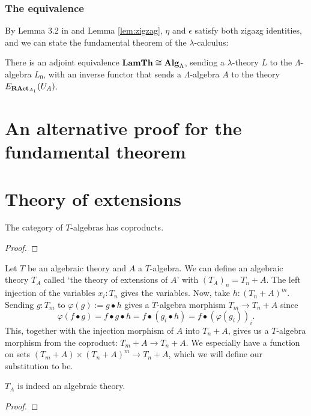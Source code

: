 \subsubsection{The equivalence}

By Lemma 3.2 in \cite{nlab:adjoint_equivalence} and Lemma \ref{lem:zigzag}, $ \eta $ and $ \epsilon $ satisfy both zigazg identities, and we can state the fundamental theorem of the $ \lambda $-calculus:
\begin{theorem}
  There is an adjoint equivalence $ \mathbf{LamTh} \cong \mathbf{Alg}_{\Lambda} $, sending a $ \lambda $-theory $ L $ to the $ \Lambda $-algebra $ L_0 $, with an inverse functor that sends a $ \Lambda $-algebra $ A $ to the theory $ E_{\mathbf{RAct}_{A_1}}(U_A) $.
\end{theorem}

\section{An alternative proof for the fundamental theorem}


\section{Theory of extensions}

\begin{lemma}
  The category of $ T $-algebras has coproducts.
\end{lemma}
\begin{proof}
  \TODO
\end{proof}

\begin{definition}
  Let $ T $ be an algebraic theory and $ A $ a $ T $-algebra. We can define an algebraic theory $ T_A $ called `the theory of extensions of $ A $' with $ (T_A)_n = T_n + A $. The left injection of the variables $ x_i : T_n $ gives the variables.
  Now, take $ h: (T_n + A)^m $. Sending $ g: T_m $ to $ \varphi(g) := g \bullet h $ gives a $ T $-algebra morphism $ T_m \to T_n + A $ since
  \[ \varphi(f \bullet g) = f \bullet g \bullet h = f \bullet (g_i \bullet h) = f \bullet (\varphi(g_i))_i. \]
  This, together with the injection morphism of $ A $ into $ T_n + A $, gives us a $ T $-algebra morphism from the coproduct: $ T_m + A \to T_n + A $. We especially have a function on sets $ (T_m + A) \times (T_n + A)^m \to T_n + A $, which we will define our substitution to be.
\end{definition}

\begin{lemma}
  $ T_A $ is indeed an algebraic theory.
\end{lemma}
\begin{proof}
  \TODO
\end{proof}

